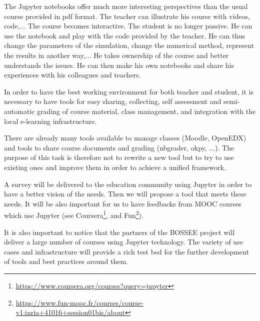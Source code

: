 \begin{task}[
  title=Teaching tools,
  id=teaching-tools,
  lead=EP,
  PM=20, %
  wphases={0-36},
  partners={EP,UPSUD}]

  The Jupyter notebooks offer much more interesting perspectives than the usual
  course provided in pdf format. The teacher can illustrate his course with
  videos, code,... The course becomes interactive. The student is no longer
  passive. He can use the notebook and play with the code provided by
  the teacher. He can thus change the parameters of the simulation, change the
  numerical method, represent the results in another way,... He takes ownership
  of the course and better understands the issues. He can then make his own
  notebooks and share his experiences with his colleagues and teachers.

  In order to have the best working environment for both teacher and student, it
  is necessary to have tools for easy sharing,
  collecting, self assessment and semi-automatic grading of course material,
  class management, and integration with the local e-learning infrastructure.
  
  There are already many tools available to manage classes (Moodle, OpenEDX) and tools to
  share course documents and grading (nbgrader, okpy, ...). The purpose of this
  task is therefore not to rewrite a new tool but to try to use existing ones
  and improve them in order to achieve a unified framework.

  A survey will be delivered to the education community using Jupyter in order
  to have a better vision of the needs. Then we will propose a tool that meets
  these needs. It will be also important for us to have feedbacks from MOOC
  courses which use Jupyter (see
  Coursera\footnote{\url{https://www.coursera.org/courses?query=jupyter}}, and
  Fun\footnote{\url{https://www.fun-mooc.fr/courses/course-v1:inria+41016+session01bis/about}}).

  It is also important to notice that the partners of the BOSSEE project will
  deliver a large number of courses using Jupyter technology. The variety of use
  cases and infrastructure will provide a rich test bed for the further
  development of tools and best practices around them.


\end{task}

